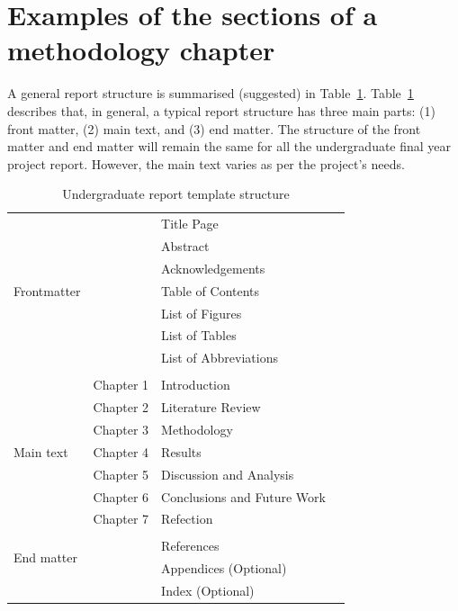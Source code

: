 \section{Examples of the sections of a methodology chapter}
A general report structure is summarised (suggested) in
Table~\ref{tab:gen_template}. Table~\ref{tab:gen_template} describes
that, in general, a typical report structure has three main parts:
(1) front matter, (2) main text, and (3) end matter. %
The structure of the front matter and end matter will remain the same
for all the undergraduate final year project report. However, the
main text varies as per the project's needs.
\begin{table}[!ht]
  \centering
  \caption{Undergraduate report template structure}
  \label{tab:gen_template}
  \begin{tabular}{llll}
    \toprule
    \multirow{7}{3cm}{Frontmatter}
    & & Title Page & \\
    & & Abstract &    \\
    & & Acknowledgements & \\
    & & Table of Contents &    \\
    & & List of Figures   &    \\
    & & List of Tables    &    \\
    & & List of Abbreviations  &    \\
    & &   &    \\
    \multirow{7}{3cm}{Main text}
    & Chapter 1 & Introduction   &    \\
    & Chapter 2 & Literature Review   &    \\
    & Chapter 3 & Methodology   &    \\
    & Chapter 4 & Results    &    \\
    & Chapter 5 & Discussion and Analysis  &    \\
    & Chapter 6 & Conclusions and Future Work  &    \\
    & Chapter 7 & Refection  &    \\
    & &   &    \\
    \multirow{2}{3cm}{End matter}
    & & References  &    \\
    & & Appendices (Optional)  &    \\
    & & Index (Optional)  &    \\
    \bottomrule
  \end{tabular}
\end{table}

